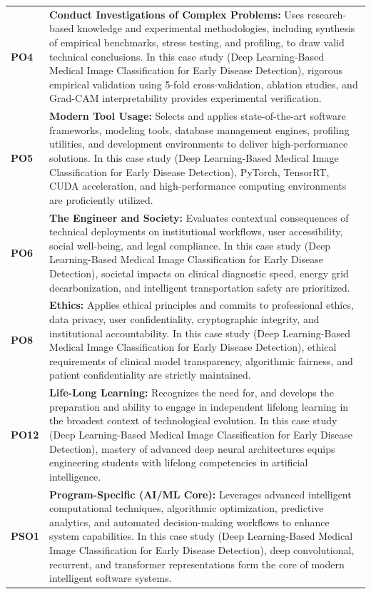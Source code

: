 {\begin{longtable}{@{}>{\centering\arraybackslash}p{1.8cm} p{13.2cm}@{}}
    \addlinespace
\textbf{PO4} & \textbf{Conduct Investigations of Complex Problems:} Uses research-based knowledge and experimental methodologies, including synthesis of empirical benchmarks, stress testing, and profiling, to draw valid technical conclusions. In this case study (Deep Learning-Based Medical Image Classification for Early Disease Detection), rigorous empirical validation using 5-fold cross-validation, ablation studies, and Grad-CAM interpretability provides experimental verification. \\
    \addlinespace
\textbf{PO5} & \textbf{Modern Tool Usage:} Selects and applies state-of-the-art software frameworks, modeling tools, database management engines, profiling utilities, and development environments to deliver high-performance solutions. In this case study (Deep Learning-Based Medical Image Classification for Early Disease Detection), PyTorch, TensorRT, CUDA acceleration, and high-performance computing environments are proficiently utilized. \\
    \addlinespace
\textbf{PO6} & \textbf{The Engineer and Society:} Evaluates contextual consequences of technical deployments on institutional workflows, user accessibility, social well-being, and legal compliance. In this case study (Deep Learning-Based Medical Image Classification for Early Disease Detection), societal impacts on clinical diagnostic speed, energy grid decarbonization, and intelligent transportation safety are prioritized. \\
    \addlinespace
\textbf{PO8} & \textbf{Ethics:} Applies ethical principles and commits to professional ethics, data privacy, user confidentiality, cryptographic integrity, and institutional accountability. In this case study (Deep Learning-Based Medical Image Classification for Early Disease Detection), ethical requirements of clinical model transparency, algorithmic fairness, and patient confidentiality are strictly maintained. \\
    \addlinespace
\textbf{PO12} & \textbf{Life-Long Learning:} Recognizes the need for, and develops the preparation and ability to engage in independent lifelong learning in the broadest context of technological evolution. In this case study (Deep Learning-Based Medical Image Classification for Early Disease Detection), mastery of advanced deep neural architectures equips engineering students with lifelong competencies in artificial intelligence. \\
    \addlinespace
\textbf{PSO1} & \textbf{Program-Specific (AI/ML Core):} Leverages advanced intelligent computational techniques, algorithmic optimization, predictive analytics, and automated decision-making workflows to enhance system capabilities. In this case study (Deep Learning-Based Medical Image Classification for Early Disease Detection), deep convolutional, recurrent, and transformer representations form the core of modern intelligent software systems. \\

\end{longtable}}
